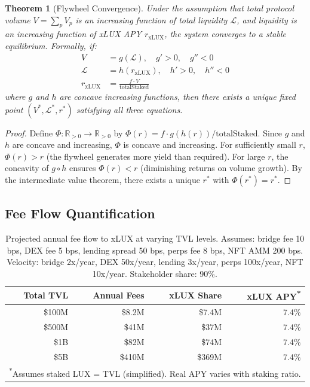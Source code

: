 \documentclass[11pt,twocolumn]{article}
\newtheorem{theorem}{Theorem}[section]
\begin{document}
\begin{theorem}[Flywheel Convergence]\label{thm:flywheel}
Under the assumption that total protocol volume $V = \sum_p V_p$ is an increasing function of total liquidity $\mathcal{L}$, and liquidity is an increasing function of xLUX APY $r_{\text{xLUX}}$, the system converges to a stable equilibrium. Formally, if:
\begin{align}
  V &= g(\mathcal{L}), \quad g' > 0, \quad g'' < 0 \label{eq:fly1} \\
  \mathcal{L} &= h(r_{\text{xLUX}}), \quad h' > 0, \quad h'' < 0 \label{eq:fly2} \\
  r_{\text{xLUX}} &= \frac{f \cdot V}{\text{totalStaked}} \label{eq:fly3}
\end{align}
where $g$ and $h$ are concave increasing functions, then there exists a unique fixed point $(V^*, \mathcal{L}^*, r^*)$ satisfying all three equations.
\end{theorem}

\begin{proof}
Define $\Phi: \mathbb{R}_{>0} \to \mathbb{R}_{>0}$ by $\Phi(r) = f \cdot g(h(r)) / \text{totalStaked}$. Since $g$ and $h$ are concave and increasing, $\Phi$ is concave and increasing. For sufficiently small $r$, $\Phi(r) > r$ (the flywheel generates more yield than required). For large $r$, the concavity of $g \circ h$ ensures $\Phi(r) < r$ (diminishing returns on volume growth). By the intermediate value theorem, there exists a unique $r^*$ with $\Phi(r^*) = r^*$.
\end{proof}

\subsection{Fee Flow Quantification}

\begin{table}[h]
\centering
\small
\caption{Projected annual fee flow to xLUX at varying TVL levels. Assumes: bridge fee 10 bps, DEX fee 5 bps, lending spread 50 bps, perps fee 8 bps, NFT AMM 200 bps. Velocity: bridge 2x/year, DEX 50x/year, lending 3x/year, perps 100x/year, NFT 10x/year. Stakeholder share: 90\%.}
\label{tab:fee_flow}
\begin{tabular}{@{}rrrr@{}}
\toprule
\textbf{Total TVL} & \textbf{Annual Fees} & \textbf{xLUX Share} & \textbf{xLUX APY\textsuperscript{*}} \\
\midrule
\$100M & \$8.2M & \$7.4M & 7.4\% \\
\$500M & \$41M & \$37M & 7.4\% \\
\$1B & \$82M & \$74M & 7.4\% \\
\$5B & \$410M & \$369M & 7.4\% \\
\bottomrule
\multicolumn{4}{l}{\textsuperscript{*}\scriptsize Assumes staked LUX = TVL (simplified). Real APY varies with staking ratio.}
\end{tabular}
\end{table}
\end{document}
